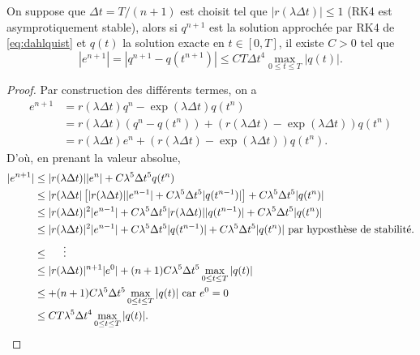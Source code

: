\begin{proposition}
On suppose que $\Delta t = T/(n+1)$ est choisit tel que $|r(\lambda \Delta t ) | \leq 1$ (RK4 est asymprotiquement stable), alors si $q^{n+1}$ est la solution approchée par RK4 de \eqref{eq:dahlquist} et $q(t)$ la solution exacte en $t \in [0,T]$, il existe $C>0$ tel que
\begin{equation}
| e^{n+1} | = | q^{n+1} - q(t^{n+1}) | \leq C T \Delta t^4 \max_{0 \leq t \leq T} | q(t) |.
\end{equation}
\label{prop:consistance_rk4}
\end{proposition}

\begin{proof}
Par construction des différents termes, on a
\begin{align*}
e^{n+1} & = r(\lambda \Delta t) q^n - \exp \left( \lambda \Delta t \right) q(t^n) \\
	& = r(\lambda \Delta t) \left( q^n - q(t^n) \right) + \left( r(\lambda \Delta t) - \exp \left( \lambda \Delta t  \right) \right) q(t^n) \\
	& = r(\lambda \Delta t) e^n + \left( r(\lambda \Delta t) - \exp \left( \lambda \Delta t  \right) \right) q(t^n).
\end{align*}
D'où, en prenant la valeur absolue, 
\begin{align*}
|e^{n+1}| & \leq |r(\lambda \Delta t)| |e^n| + C \lambda^5 \Delta t^5 q(t^n) \\
		& \leq  |r(\lambda \Delta t| \left[ |r(\lambda \Delta t)| |e^{n-1}| + C \lambda^5 \Delta t^5 |q(t^{n-1})| \right] + C \lambda^5 \Delta t^5 |q(t^n)| \\
		& \leq |r(\lambda \Delta t)|^2 |e^{n-1}| + C \lambda^5 \Delta t^5 |r(\lambda \Delta t)| |q(t^{n-1})| + C \lambda^5 \Delta t^5 |q(t^n)| \\
		& \leq |r(\lambda \Delta t)|^2 |e^{n-1}| + C \lambda^5 \Delta t^5  |q(t^{n-1})| + C \lambda^5 \Delta t^5 |q(t^n)| \text{ par hyposthèse de stabilité.}\\
		& \leq \hspace{0.5cm} \vdots \\
		& \leq |r(\lambda \Delta t)|^{n+1} | e^0 | + (n+1) C \lambda^5 \Delta t^5 \max_{0 \leq t \leq T} |q(t)| \\
		& \leq + (n+1) C \lambda^5 \Delta t^5 \max_{0 \leq t \leq T} |q(t)| \text{ car } e^0 = 0 \\
		& \leq C T \lambda^5 \Delta t^4 \max_{0 \leq t \leq T} |q(t)|.
\end{align*}
\end{proof}




